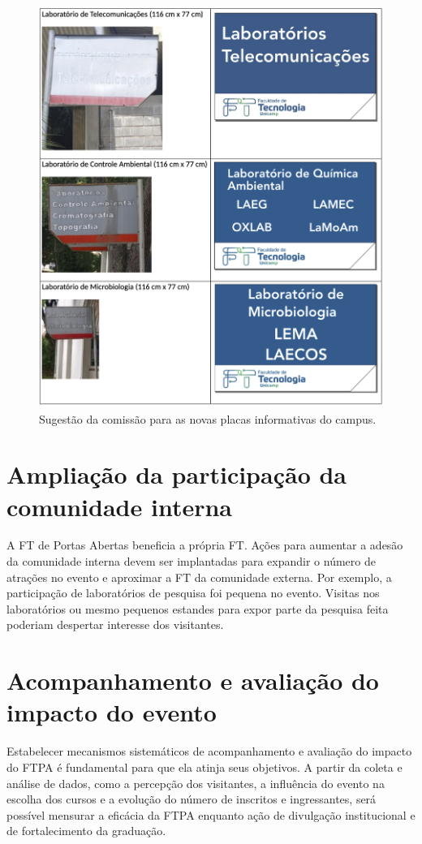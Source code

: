 \documentclass[
  letterpaper,
  DIV=11,
  numbers=noendperiod]{scrreprt}
\begin{document}
\begin{figure}[H]

{\centering \includegraphics[width=0.6\linewidth,height=\textheight,keepaspectratio]{recomendacoes/placas.png}

}

\caption{Sugestão da comissão para as novas placas informativas do
campus.}

\end{figure}%

\section{Ampliação da participação da comunidade
interna}\label{ampliauxe7uxe3o-da-participauxe7uxe3o-da-comunidade-interna}

A FT de Portas Abertas beneficia a própria FT. Ações para aumentar a
adesão da comunidade interna devem ser implantadas para expandir o
número de atrações no evento e aproximar a FT da comunidade externa. Por
exemplo, a participação de laboratórios de pesquisa foi pequena no
evento. Visitas nos laboratórios ou mesmo pequenos estandes para expor
parte da pesquisa feita poderiam despertar interesse dos visitantes.

\section{Acompanhamento e avaliação do impacto do
evento}\label{acompanhamento-e-avaliauxe7uxe3o-do-impacto-do-evento}

Estabelecer mecanismos sistemáticos de acompanhamento e avaliação do
impacto do FTPA é fundamental para que ela atinja seus objetivos. A
partir da coleta e análise de dados, como a percepção dos visitantes, a
influência do evento na escolha dos cursos e a evolução do número de
inscritos e ingressantes, será possível mensurar a eficácia da FTPA
enquanto ação de divulgação institucional e de fortalecimento da
graduação.
\end{document}
